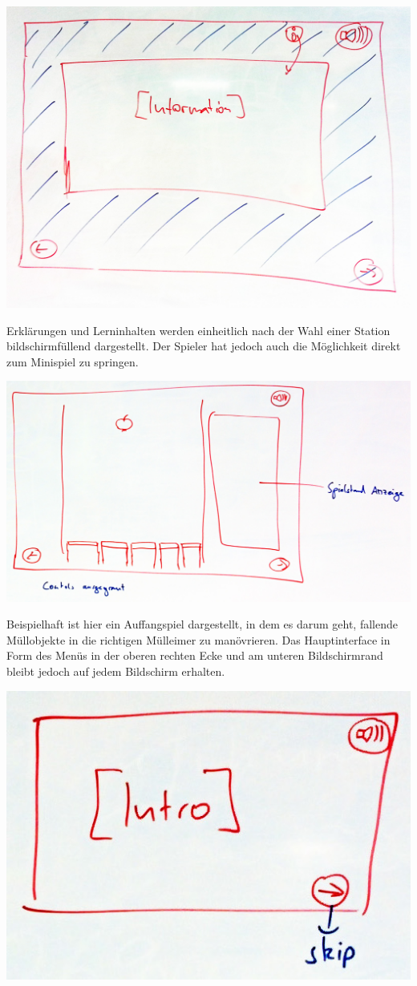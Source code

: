 \documentclass[a4paper]{article}
\begin{document}
\begin{enumerate}
\begin{center}
\includegraphics[width=.8\linewidth]{../mockups/lerninfo}
\end{center}

Erklärungen und Lerninhalten werden einheitlich nach der Wahl einer Station bildschirmfüllend dargestellt.
Der Spieler hat jedoch auch die Möglichkeit direkt zum Minispiel zu springen.

\begin{center}
\includegraphics[width=.8\linewidth]{../mockups/minispiel}
\end{center}

Beispielhaft ist hier ein Auffangspiel dargestellt, in dem es darum geht, fallende Müllobjekte in die richtigen Mülleimer zu manövrieren.
Das Hauptinterface in Form des Menüs in der oberen rechten Ecke und am unteren Bildschirmrand bleibt jedoch auf jedem Bildschirm erhalten.

\begin{center}
\includegraphics[width=.8\linewidth]{../mockups/intro}
\end{center}



\end{enumerate}
\end{document}
